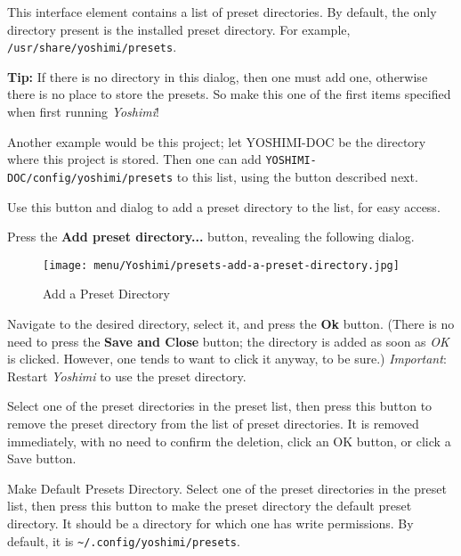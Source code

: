    \setcounter{ItemCounter}{0}      %

   This interface element contains a list of preset directories.
   By default, the only directory present is the installed preset directory.
   For example, \texttt{/usr/share/yoshimi/presets}.
   
   \textbf{Tip:}
   If there is no directory in this dialog, then one must
   add one, otherwise there is no place to store the presets.
   So make this one of the first items specified when first running
   \textsl{Yoshimi}!

   Another example would be this project; let YOSHIMI-DOC be the directory
   where this project is stored.  Then one can add
   \texttt{YOSHIMI-DOC/config/yoshimi/presets} to this list, using the
   button described next.

   Use this button and dialog to add a preset directory to the list, for
   easy access.

   Press the \textbf{Add preset directory...} button, revealing the
   following dialog.

\begin{figure}[H]
   \centering 
   \texttt{[image: menu/Yoshimi/presets-add-a-preset-directory.jpg]}
   \caption[Add Preset Directory]{Add a Preset Directory}
   \label{fig:presets_add_a_preset_directory}
\end{figure}

   Navigate to the desired directory, select it, and press the \textbf{Ok}
   button.  (There is no need to press the \textbf{Save and Close} button;
   the directory is added as soon as \textsl{OK} is clicked.  However, one
   tends to want to click it anyway, to be sure.)
   \textsl{Important}:  Restart \textsl{Yoshimi} to use the preset directory.

   Select one of the preset directories in the preset list, then press this
   button to remove the preset directory from the list of preset
   directories.  It is removed immediately, with no need to confirm the
   deletion, click an OK button, or click a Save button.

   Make Default Presets Directory.
   Select one of the preset directories in the preset list, then press this
   button to make the preset directory the default preset directory.
   It should be a directory for which one has write permissions.
   By default, it is \texttt{\textasciitilde/.config/yoshimi/presets}.

